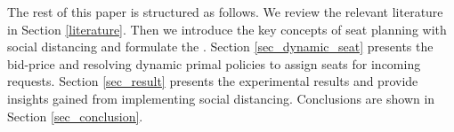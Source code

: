 




The rest of this paper is structured as follows. We review the relevant literature in Section \ref{literature}. Then we introduce the key concepts of seat planning with social distancing and formulate the . Section \ref{sec_dynamic_seat} presents the bid-price and resolving dynamic primal policies to assign seats for incoming requests. Section \ref{sec_result} presents the experimental results and provide insights gained from implementing social distancing. Conclusions are shown in Section \ref{sec_conclusion}.

